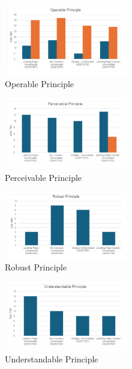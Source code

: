 \documentclass{IEEEtran}
\begin{document}
\begin{figure}[H]
    \includegraphics[width=0.48\textwidth]{images/operablePrinciple.png}
    \caption{Operable Principle}
    \label{fig:figure4}
\end{figure}


\begin{figure}[H]
    \includegraphics[width=0.48\textwidth]{images/perceivablePrinciple.png}
    \caption{Perceivable Principle}
    \label{fig:figure5}
\end{figure}


\begin{figure}[H]
    \includegraphics[width=0.48\textwidth]{images/robustPrinciple.png}
    \caption{Robust Principle}
    \label{fig:figure6}
\end{figure}

\begin{figure}[H]
    \includegraphics[width=0.48\textwidth]{images/undestandablePrinciple.png}
    \caption{Understandable Principle}
    \label{fig:figure7}
\end{figure}
\end{document}
